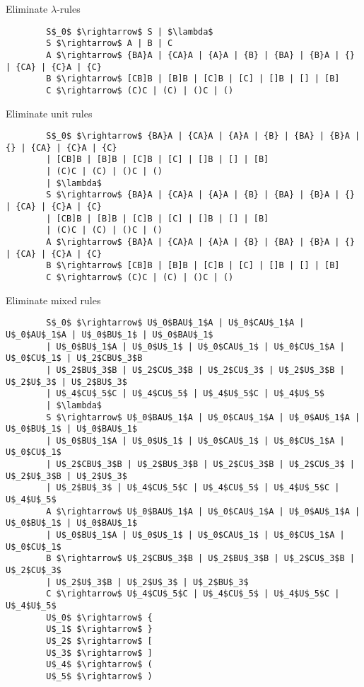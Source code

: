 \documentclass[11pt letter]{article}
\begin{document}
    Eliminate $\lambda$-rules
    \begin{lstlisting}
        S$_0$ $\rightarrow$ S | $\lambda$
        S $\rightarrow$ A | B | C
        A $\rightarrow$ {BA}A | {CA}A | {A}A | {B} | {BA} | {B}A | {} | {CA} | {C}A | {C}
        B $\rightarrow$ [CB]B | [B]B | [C]B | [C] | []B | [] | [B]
        C $\rightarrow$ (C)C | (C) | ()C | ()
    \end{lstlisting}
    Eliminate unit rules
    \begin{lstlisting}
        S$_0$ $\rightarrow$ {BA}A | {CA}A | {A}A | {B} | {BA} | {B}A | {} | {CA} | {C}A | {C}
        | [CB]B | [B]B | [C]B | [C] | []B | [] | [B]
        | (C)C | (C) | ()C | ()
        | $\lambda$
        S $\rightarrow$ {BA}A | {CA}A | {A}A | {B} | {BA} | {B}A | {} | {CA} | {C}A | {C}
        | [CB]B | [B]B | [C]B | [C] | []B | [] | [B]
        | (C)C | (C) | ()C | ()
        A $\rightarrow$ {BA}A | {CA}A | {A}A | {B} | {BA} | {B}A | {} | {CA} | {C}A | {C}
        B $\rightarrow$ [CB]B | [B]B | [C]B | [C] | []B | [] | [B]
        C $\rightarrow$ (C)C | (C) | ()C | ()
    \end{lstlisting}
    Eliminate mixed rules
    \begin{lstlisting}
        S$_0$ $\rightarrow$ U$_0$BAU$_1$A | U$_0$CAU$_1$A | U$_0$AU$_1$A | U$_0$BU$_1$ | U$_0$BAU$_1$
        | U$_0$BU$_1$A | U$_0$U$_1$ | U$_0$CAU$_1$ | U$_0$CU$_1$A | U$_0$CU$_1$ | U$_2$CBU$_3$B
        | U$_2$BU$_3$B | U$_2$CU$_3$B | U$_2$CU$_3$ | U$_2$U$_3$B | U$_2$U$_3$ | U$_2$BU$_3$
        | U$_4$CU$_5$C | U$_4$CU$_5$ | U$_4$U$_5$C | U$_4$U$_5$
        | $\lambda$
        S $\rightarrow$ U$_0$BAU$_1$A | U$_0$CAU$_1$A | U$_0$AU$_1$A | U$_0$BU$_1$ | U$_0$BAU$_1$
        | U$_0$BU$_1$A | U$_0$U$_1$ | U$_0$CAU$_1$ | U$_0$CU$_1$A | U$_0$CU$_1$
        | U$_2$CBU$_3$B | U$_2$BU$_3$B | U$_2$CU$_3$B | U$_2$CU$_3$ | U$_2$U$_3$B | U$_2$U$_3$
        | U$_2$BU$_3$ | U$_4$CU$_5$C | U$_4$CU$_5$ | U$_4$U$_5$C | U$_4$U$_5$
        A $\rightarrow$ U$_0$BAU$_1$A | U$_0$CAU$_1$A | U$_0$AU$_1$A | U$_0$BU$_1$ | U$_0$BAU$_1$
        | U$_0$BU$_1$A | U$_0$U$_1$ | U$_0$CAU$_1$ | U$_0$CU$_1$A | U$_0$CU$_1$
        B $\rightarrow$ U$_2$CBU$_3$B | U$_2$BU$_3$B | U$_2$CU$_3$B | U$_2$CU$_3$
        | U$_2$U$_3$B | U$_2$U$_3$ | U$_2$BU$_3$
        C $\rightarrow$ U$_4$CU$_5$C | U$_4$CU$_5$ | U$_4$U$_5$C | U$_4$U$_5$
        U$_0$ $\rightarrow$ {
        U$_1$ $\rightarrow$ }
        U$_2$ $\rightarrow$ [
        U$_3$ $\rightarrow$ ]
        U$_4$ $\rightarrow$ (
        U$_5$ $\rightarrow$ )
    \end{lstlisting}
\end{document}
